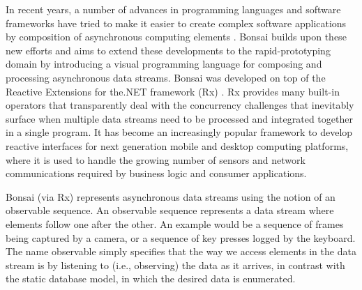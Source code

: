 In recent years, a number of advances in programming languages and software frameworks have tried to make it easier to create complex software applications by composition of asynchronous computing elements \cite{Bainomugisha2013}. Bonsai builds upon these new efforts and aims to extend these developments to the rapid-prototyping domain by introducing a visual programming language for composing and processing asynchronous data streams. Bonsai was developed on top of the Reactive Extensions for the.NET framework (Rx) \cite{MicrosoftOpenTechnologies2014}. Rx provides many built-in operators that transparently deal with the concurrency challenges that inevitably surface when multiple data streams need to be processed and integrated together in a single program. It has become an increasingly popular framework to develop reactive interfaces for next generation mobile and desktop computing platforms, where it is used to handle the growing number of sensors and network communications required by business logic and consumer applications.

Bonsai (via Rx) represents asynchronous data streams using the notion of an observable sequence. An observable sequence represents a data stream where elements follow one after the other. An example would be a sequence of frames being captured by a camera, or a sequence of key presses logged by the keyboard. The name observable simply specifies that the way we access elements in the data stream is by listening to (i.e., observing) the data as it arrives, in contrast with the static database model, in which the desired data is enumerated.

